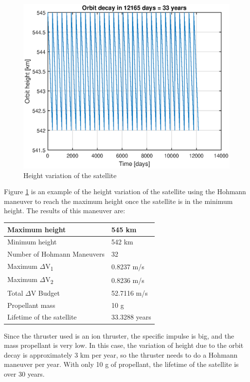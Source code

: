 \begin{figure}[h]
\centerline{\includegraphics[scale=1]{ThrustersDrag/thrust3km.eps}}
\caption{Height variation of the satellite}
\label{fig:hohmann3km}
\end{figure}

Figure \ref{fig:hohmann3km} is an example of the height variation of the satellite using the Hohmann maneuver to reach the maximum height once the satellite is in the minimum height. The results of this maneuver are:

\begin{center}
\begin{tabular}{ | l | l | }
\hline
Maximum height & 545 km \\
\hline
Minimum height & 542 km \\
\hline
Number of Hohmann Maneuvers & 32 \\
\hline
Maximum $\Delta$V\textsubscript{1} & 0.8237 m/s \\
\hline
Maximum $\Delta$V\textsubscript{2} & 0.8236 m/s \\
\hline
Total $\Delta$V Budget & 52.7116 m/s \\ 
\hline 
Propellant mass & 10 g \\
\hline
Lifetime of the satellite & 33.3288 years \\
\hline
\end{tabular}
\end{center}

\noindent
Since the thruster used is an ion thruster, the specific impulse is big, and the mass propellant is very low. In this case, the variation of height due to the orbit decay is approximately 3 km per year, so the thruster needs to do a Hohmann maneuver per year. With only 10 g of propellant, the lifetime of the satellite is over 30 years.

